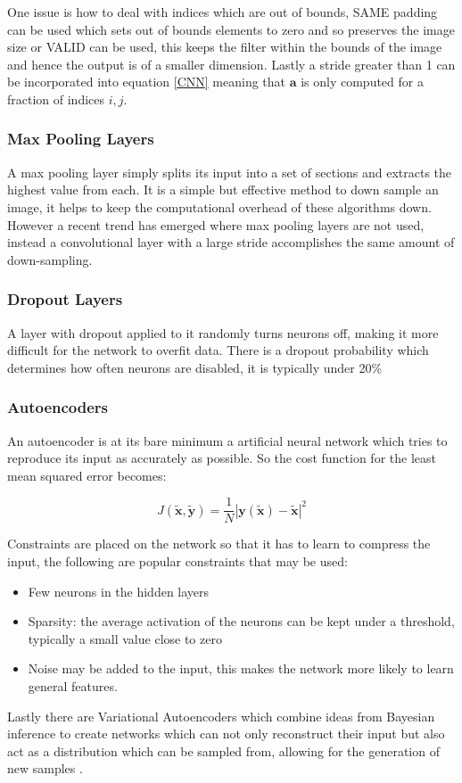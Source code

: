 \documentclass[9pt]{article} \usepackage{amsmath, amsthm, amssymb}
\begin{document}
One issue is how to deal with indices which are out of bounds, SAME padding can be used which sets out of bounds
elements to zero and so preserves the image size or VALID can be used, this keeps the filter within the bounds of the
image and hence the output is of a smaller dimension. Lastly a stride greater than 1 can be incorporated into equation
\ref{CNN} meaning that $\mathbf{a}$ is only computed for a fraction of indices $i,j$.
\subsubsection*{Max Pooling Layers}
A max pooling layer simply splits its input into a set of sections and extracts
the highest value from each. It is a simple but effective method to down sample
an image, it helps to keep the computational overhead of these algorithms
down. However a recent trend \cite{Springenberg2015} has emerged where max pooling
layers are not used, instead a convolutional layer with a large stride accomplishes
the same amount of down-sampling.
\subsubsection*{Dropout Layers}
A layer with dropout applied to it randomly turns neurons off, making it more
difficult for the network to overfit data. There is a dropout probability
which determines how often neurons are disabled, it is typically under 20\%
\subsubsection{Autoencoders}
An autoencoder is at its bare minimum a artificial neural network which tries
to reproduce its input as accurately as possible. So the cost function for the
least mean squared error becomes:

\begin{equation}
    J(\tilde{\mathbf{x}},\tilde{\mathbf{y}}) = \frac{1}{N}\left |\mathbf{y}(\tilde{\mathbf{x}})-\tilde{\mathbf{x}}\right | ^2
\end{equation}

Constraints are
placed on the network so that it has to learn to compress the input, the following
are popular constraints that may be used:
\begin{itemize}
    \item Few neurons in the hidden layers
    \item Sparsity: the average activation of the neurons can be kept under a
    threshold, typically a small value close to zero \cite{autong}
    \item Noise may be added to the input, this makes the network more likely
    to learn general features.
\end{itemize}
Lastly there are Variational Autoencoders which combine ideas from Bayesian inference
to create networks which can not only reconstruct their input but also act as a
distribution which can be sampled from, allowing for the generation of new samples \cite{Kingma2013}.
\end{document}
